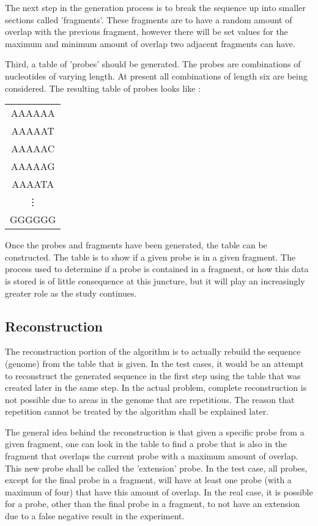 The next step in the generation process is to break the sequence up into
smaller sections
called 'fragments'.  These fragments are to have a random amount of overlap
with the previous fragment, however there will be set values for the
maximum and minimum amount of overlap two adjacent fragments can have.

Third, a table of 'probes' should be generated.  The probes are
combinations of nucleotides of varying length.  At present all combinations
of length six are being considered.  The resulting table of probes looks like
:
\begin{center}
\begin{tabular}{c}
AAAAAA \\ 
AAAAAT \\ 
AAAAAC \\ 
AAAAAG \\ 
AAAATA \\ 
 \vdots \\ 
GGGGGG
\end{tabular}
\end{center}

Once the probes and fragments have been generated, the table can be
constructed.  The table is to show if a given probe is in a given fragment.
The process used to determine if a probe is contained in a fragment, or how
this data is stored is of little consequence at this juncture, but it
will play an increasingly greater role as the study continues.

\subsection{Reconstruction}
The reconstruction portion of the algorithm is to actually rebuild the
sequence (genome) from the table that is given.  In the test cases, it
would be an attempt to reconstruct the generated sequence in the first step
using the table that was created later in the same step.  In the actual
problem, complete reconstruction is not possible due to areas in the genome
that are repetitious.  The reason that repetition cannot be treated by the
algorithm shall be explained later.

The general idea behind the reconstruction is that given a specific probe
from a given fragment, one can look in the table to find a probe that is
also in the fragment that overlaps the current probe with a maximum amount
of overlap.  This new probe shall be called the 'extension' probe.  In the 
test case, all probes, except for the final probe in a fragment, will 
have at least one probe
(with a maximum of four) that have this amount of overlap.  In the real
case, it is possible for a probe, other than the final probe in a fragment,
to not have an extension due to a false negative result in the experiment.

